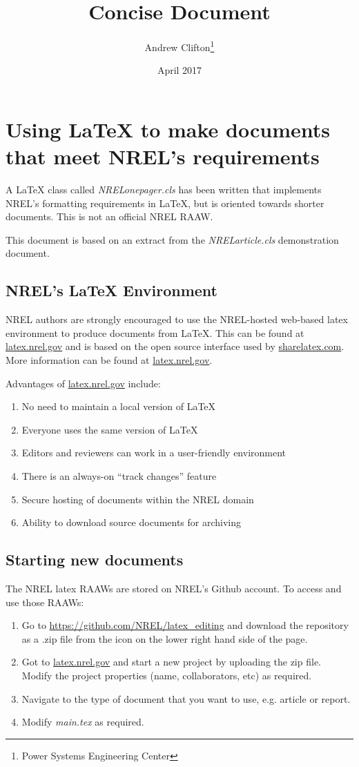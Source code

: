 \documentclass[draft]{NRELonepager}
\title{Concise Document}
\author{Andrew Clifton\thanks{Power Systems Engineering Center}}
\date{April 2017}
\begin{document}
\maketitle

\section{Using LaTeX to make documents that meet NREL's requirements}

A LaTeX class called \emph{NRELonepager.cls} has been written that implements NREL's formatting requirements in LaTeX, but is oriented towards shorter documents. This is not an official NREL RAAW.

This document is based on an extract from the \emph{NRELarticle.cls} demonstration document.

\subsection{NREL's LaTeX Environment}
NREL authors are strongly encouraged to use the NREL-hosted web-based latex environment to produce documents from LaTeX. This can be found at \href{latex.nrel.gov}{latex.nrel.gov} and is based on the open source interface used by \href{sharelatex.com}{sharelatex.com}. More information can be found at \href{latex.nrel.gov}{latex.nrel.gov}.

Advantages of \href{latex.nrel.gov}{latex.nrel.gov} include:
\begin{enumerate}
\item No need to maintain a local version of LaTeX
\item Everyone uses the same version of LaTeX
\item Editors and reviewers can work in a user-friendly environment
\item There is an always-on ``track changes'' feature
\item Secure hosting of documents within the NREL domain
\item Ability to download source documents for archiving
\end{enumerate}

\subsection{Starting new documents}
The NREL latex RAAWs are stored on NREL's Github account. To access and use those RAAWs:
\begin{enumerate}
\item Go to \href{https://github.com/NREL/latex_editing}{https://github.com/NREL/latex\_editing} and download the repository as a .zip file from the icon on the lower right hand side of the page.
\item Got to \href{latex.nrel.gov}{latex.nrel.gov} and start a new project by uploading the zip file. Modify the project properties (name, collaborators, etc) as required.
\item Navigate to the type of document that you want to use, e.g. article or report.
\item Modify \emph{main.tex} as required.
\end{enumerate}
\end{document}
